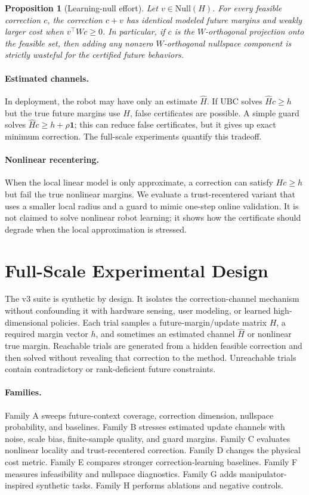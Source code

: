 \documentclass{article}
\newtheorem{proposition}{Proposition}
\begin{document}
\begin{proposition}[Learning-null effort]
Let $v\in\mathrm{Null}(H)$. For every feasible correction $c$, the correction
$c+v$ has identical modeled future margins and weakly larger cost when
$v^\top W c\ge 0$. In particular, if $c$ is the $W$-orthogonal projection onto
the feasible set, then adding any nonzero $W$-orthogonal nullspace component is
strictly wasteful for the certified future behaviors.
\end{proposition}

\paragraph{Estimated channels.}
In deployment, the robot may have only an estimate $\hat H$. If UBC solves
$\hat Hc\ge h$ but the true future margins use $H$, false certificates are
possible. A simple guard solves $\hat Hc\ge h+\rho\mathbf{1}$; this can reduce
false certificates, but it gives up exact minimum correction. The full-scale
experiments quantify this tradeoff.

\paragraph{Nonlinear recentering.}
When the local linear model is only approximate, a correction can satisfy
$Hc\ge h$ but fail the true nonlinear margins. We evaluate a trust-recentered
variant that uses a smaller local radius and a guard to mimic one-step online
validation. It is not claimed to solve nonlinear robot learning; it shows how
the certificate should degrade when the local approximation is stressed.

\section{Full-Scale Experimental Design}

The v3 suite is synthetic by design. It isolates the correction-channel
mechanism without confounding it with hardware sensing, user modeling, or
learned high-dimensional policies. Each trial samples a future-margin/update
matrix $H$, a required margin vector $h$, and sometimes an estimated channel
$\hat H$ or nonlinear true margin. Reachable trials are generated from a hidden
feasible correction and then solved without revealing that correction to the
method. Unreachable trials contain contradictory or rank-deficient future
constraints.

\paragraph{Families.}
Family A sweeps future-context coverage, correction dimension, nullspace
probability, and baselines. Family B stresses estimated update channels with
noise, scale bias, finite-sample quality, and guard margins. Family C evaluates
nonlinear locality and trust-recentered correction. Family D changes the
physical cost metric. Family E compares stronger correction-learning baselines.
Family F measures infeasibility and nullspace diagnostics. Family G adds
manipulator-inspired synthetic tasks. Family H performs ablations and negative
controls.
\end{document}
